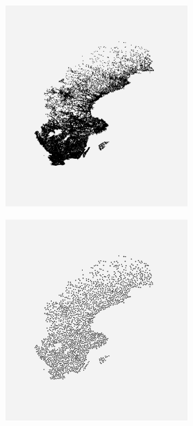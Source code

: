 \begin{figure}[!h]
	\centering
	\begin{subfigure}[b]{1.0\linewidth}
		\centering
	\begin{subfigure}[t]{0.30\linewidth}
		\centering
		\includegraphics[width=0.9\linewidth]{Pictures/sweden} 
		\vspace{2ex}
	\end{subfigure}%
	\begin{subfigure}[t]{0.30\linewidth}
		\centering
		\includegraphics[width=0.9\linewidth]{Pictures/bp10_1_sweden} 

\end{subfigure}
\end{subfigure}
\end{figure}
